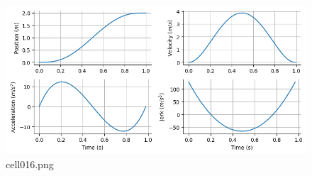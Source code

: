 \begin{figure}[ht]
	\centering
	\includegraphics[scale=0.8, max width=\linewidth]{./fig/motor-learning/minimum-jerk/cell016.png}
	\caption{cell016.png}
	\label{cell016.png}
\end{figure}